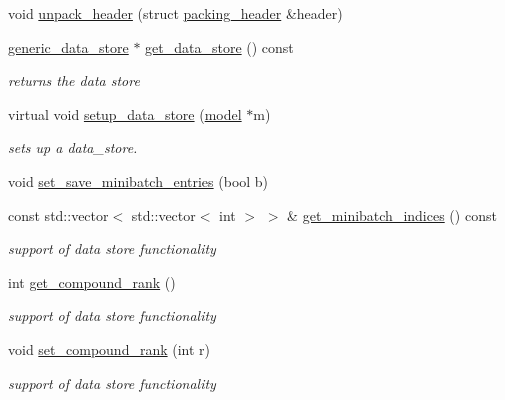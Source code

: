 \begin{DoxyCompactItemize}
\item 
void \hyperlink{classlbann_1_1generic__data__reader_a3e1c13778c04ca9fa5136ee7ee3893fb}{unpack\+\_\+header} (struct \hyperlink{structlbann_1_1generic__data__reader_1_1packing__header}{packing\+\_\+header} \&header)
\item 
\hyperlink{classlbann_1_1generic__data__store}{generic\+\_\+data\+\_\+store} $\ast$ \hyperlink{classlbann_1_1generic__data__reader_a2f1f018beecb1295c00a1ffdfa03f638}{get\+\_\+data\+\_\+store} () const
\begin{DoxyCompactList}\small\item\em returns the data store \end{DoxyCompactList}\item 
virtual void \hyperlink{classlbann_1_1generic__data__reader_a8b2a09d38512fc11f1b9d572c89100a7}{setup\+\_\+data\+\_\+store} (\hyperlink{classlbann_1_1model}{model} $\ast$m)
\begin{DoxyCompactList}\small\item\em sets up a data\+\_\+store. \end{DoxyCompactList}\item 
void \hyperlink{classlbann_1_1generic__data__reader_a19fd7c4dc234fa09ac7619e47fe18454}{set\+\_\+save\+\_\+minibatch\+\_\+entries} (bool b)
\item 
const std\+::vector$<$ std\+::vector$<$ int $>$ $>$ \& \hyperlink{classlbann_1_1generic__data__reader_a192632a8037f6a1eef202747f5916bf3}{get\+\_\+minibatch\+\_\+indices} () const
\begin{DoxyCompactList}\small\item\em support of data store functionality \end{DoxyCompactList}\item 
int \hyperlink{classlbann_1_1generic__data__reader_ac4fc0729e7f1240e167fe897df99f950}{get\+\_\+compound\+\_\+rank} ()
\begin{DoxyCompactList}\small\item\em support of data store functionality \end{DoxyCompactList}\item 
void \hyperlink{classlbann_1_1generic__data__reader_a960362f819312d39dfcba5eeecf76257}{set\+\_\+compound\+\_\+rank} (int r)
\begin{DoxyCompactList}\small\item\em support of data store functionality \end{DoxyCompactList}\end{DoxyCompactItemize}
